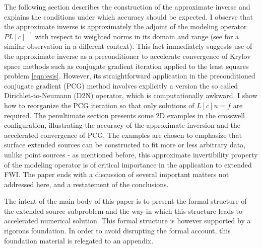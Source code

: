 The following section describes the construction of the approximate
inverse and explains the conditions under which accuracy should be expected. I observe that the approximate inverse is approximately the adjoint of the modeling operator $PL[c]^{-1}$ with respect to weighted norms in its domain and range (see \cite{HouSymes:15} for a similar observation in a different context). This fact immediately suggests use of the approximate inverse as a preconditioner to accelerate convergence of Krylov space methods such as conjugate gradient iteration applied to the least squares problem \ref{eqn:esis}. However, its straightforward application in the preconditioned conjugate gradient (PCG) method \cite[]{Golub:2012} involves explicitly a version the so called Dirichlet-to-Neumann (D2N) operator, which is computationally awkward. I show how to reorganize the PCG iteration so that only solutions of $L[c]u=f$ are required. The penultimate section presents some 2D examples in the crosswell configuration, illustrating the accuracy of the approximate inversion and the accelerated convergence of PCG. The examples are chosen to emphasize that surface extended sources can be constructed to fit more or less arbitrary data, unlike point sources - as mentioned before, this approximate invertibility property of the modeling operator is of critical importance in the application to extended FWI. The paper ends with a discussion of several important matters not addressed here, and a restatement of the conclusions.

The intent of the main body of this paper is to present the formal structure of the extended source subproblem and the way in which this structure leads to accelerated numerical solution. This formal structure is however supported by a rigorous foundation. In order to avoid disrupting the formal account, this foundation material is relegated to an appendix.





